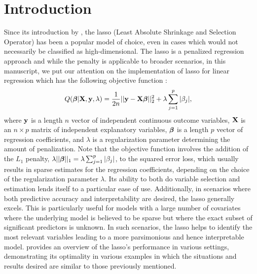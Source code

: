 \section{Introduction}



Since its introduction by \cite{Tibshirani1996}, the lasso (Least Absolute Shrinkage and Selection Operator) has been a popular model of choice, even in cases which would not necessarily be classified as high-dimensional. The lasso is a penalized regression approach and while the penalty is applicable to broader scenarios, in this manuscript, we put our attention on the implementation of lasso for linear regression which has the following objective function : $$Q(\boldsymbol{\beta}|\mathbf{X},\mathbf{y},\lambda) = \frac{1}{2n}||\mathbf{y} - \mathbf{X}\boldsymbol{\beta}||_2^2 + \lambda \sum_{j = 1}^p |\beta_j|,$$ where $\mathbf{y}$ is a length $n$ vector of independent continuous outcome variables, $\mathbf{X}$ is an $n \times p$ matrix of independent explanatory variables, $\boldsymbol{\beta}$ is a length $p$ vector of regression coefficients, and $\lambda$ is a regularization parameter determining the amount of penalization. Note that the objective function involves the addition of the $L_1$ penalty, $\lambda||\boldsymbol{\beta}||_1 = \lambda \sum_{j = 1}^p |\beta_j|$, to the squared error loss, which usually results in sparse estimates for the regression coefficients, depending on the choice of the regularization parameter $\lambda$. Its ability to both do variable selection and estimation lends itself to a particular ease of use. Additionally, in scenarios where both predictive accuracy and interpretability are desired, the lasso generally excels. This is particularly useful for models with a large number of covariates where the underlying model is believed to be sparse but where the exact subset of significant predictors is unknown. In such scenarios, the lasso helps to identify the most relevant variables leading to a more parsimonious and hence interpretable model. \cite{HTF2009} provides an overview of the lasso's performance in various settings, demonstrating its optimality in various examples in which the situations and results desired are similar to those previously mentioned. 

